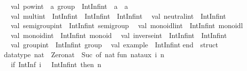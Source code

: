 \begin{isabellebody}
\begin{isamarkuptext}
\ \ val\ pow{}int\ {}\ {}a\ group\ {}{}\ IntInf{}int\ {}{}\ {}a\ {}{}\ {}a\isanewline
\ \ val\ mult{}int\ {}\ IntInf{}int\ {}{}\ IntInf{}int\ {}{}\ IntInf{}int\isanewline
\ \ val\ neutral{}int\ {}\ IntInf{}int\isanewline
\ \ val\ semigroup{}int\ {}\ IntInf{}int\ semigroup\isanewline
\ \ val\ monoidl{}int\ {}\ IntInf{}int\ monoidl\isanewline
\ \ val\ monoid{}int\ {}\ IntInf{}int\ monoid\isanewline
\ \ val\ inverse{}int\ {}\ IntInf{}int\ {}{}\ IntInf{}int\isanewline
\ \ val\ group{}int\ {}\ IntInf{}int\ group\isanewline
\ \ val\ example\ {}\ IntInf{}int\isanewline
end\ {}\ struct\isanewline
\isanewline
datatype\ nat\ {}\ Zero{}nat\ {}\ Suc\ of\ nat{}\isanewline
\isanewline
fun\ nat{}aux\ i\ n\ {}\isanewline
\ \ {}if\ IntInf{}{}{}\ {}i{}\ {}{}\ {}\ IntInf{}int{}{}\ then\ n\isanewline

\end{isamarkuptext}
\end{isabellebody}
